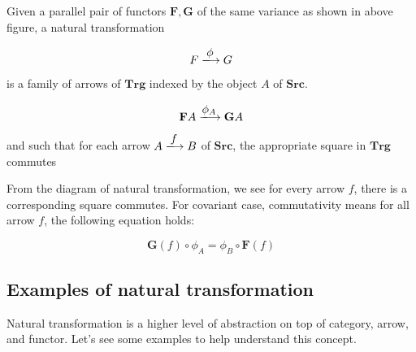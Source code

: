 \documentclass{article}
\begin{document}
\begin{definition}
Given a parallel pair of functors $\mathbf{F}, \mathbf{G}$ of the same variance as shown in above figure, a natural transformation

\[
F \arrowto{\phi} G
\]

is a family of arrows of $\pmb{Trg}$ indexed by the object $A$ of $\pmb{Src}$.

\[
\mathbf{F}A \arrowto{\phi_A} \mathbf{G}A
\]

and such that for each arrow $A \arrowto{f} B$ of $\pmb{Src}$, the appropriate square in $\pmb{Trg}$ commutes

\begin{center}

 \quad \quad \quad {}
\end{center}
\end{definition}

From the diagram of natural transformation, we see for every arrow $f$, there is a corresponding square commutes. For covariant case, commutativity means for all arrow $f$, the following equation holds:

\[
\mathbf{G}(f) \circ \phi_A= \phi_B \circ \mathbf{F}(f)
\]

\subsection{Examples of natural transformation}

Natural transformation is a higher level of abstraction on top of category, arrow, and functor. Let's see some examples to help understand this concept.
\end{document}
